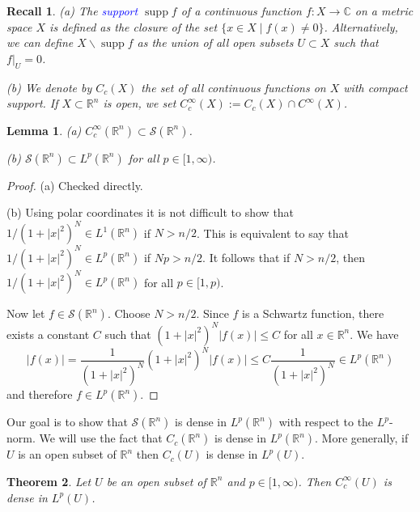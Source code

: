 \documentclass[12pt, oneside, a4paper]{article}
\newtheorem{thm}{Theorem}[section]
\newtheorem{lem}[thm]{Lemma}
\def\supp{\operatorname{supp}}
\theoremstyle{dfn}
\newtheorem{recall}{Recall}
\def \S {\ensuremath{\mathcal{S}}}
\def \S {\ensuremath{\mathcal{S}}}
\def\Rbb{\ensuremath{\mathbb{R}}}
\newcommand{\Com}{\mathbb{C}}
\providecommand{\abs}[1]{\lvert#1\rvert}
\begin{document}
\begin{recall}
(a) The \textcolor{blue}{support} $\supp f$ of a continuous function $f \colon X \to \Com$ on a metric space $X$ is defined as the closure of the set $\{ x \in X \mid f(x) \neq 0 \}$. Alternatively, we can define $X \smallsetminus \supp f$ as the union of all open subsets $U \subset X$ such that $f|_U = 0$.

(b) We denote by $C_c(X)$ the set of all continuous functions on $X$ with compact support. If $X \subset \Rbb^n$ is open, we set $C_c^\infty(X) := C_c(X) \cap C^\infty(X)$.
\end{recall}

\begin{lem}\label{SchSubsetLP}
(a) $C_c^\infty(\Rbb^n) \subset \S(\Rbb^n)$.

(b) $\S(\Rbb^n) \subset L^p(\Rbb^n)$ for all $p \in [1,\infty)$.
\end{lem}

\begin{proof}
(a) Checked directly.

(b) Using polar coordinates it is not difficult to show that $1/(1 + \abs{x}^2)^N \in L^1(\Rbb^n)$ if $N > n/2$. This is equivalent to say that $1/(1 + \abs{x}^2)^N \in L^p(\Rbb^n)$ if $Np > n/2$. It follows that if $N > n/2$, then $1/(1 + \abs{x}^2)^N \in L^p(\Rbb^n)$ for all $p \in [1,p)$.

Now let $f \in \S(\Rbb^n)$. Choose $N > n/2$. Since $f$ is a Schwartz function, there exists a constant $C$ such that $(1 + \abs{x}^2)^N \abs{f(x)} \leqslant C$ for all $x \in \Rbb^n$. We have
\[
\abs{f(x)} = \frac{1}{(1 + \abs{x}^2)^N} (1 + \abs{x}^2)^N \abs{f(x)} \leqslant C \frac{1}{(1 + \abs{x}^2)^N} \in L^p(\Rbb^n)
\]
and therefore $f \in L^p(\Rbb^n)$.
\end{proof}

Our goal is to show that $\S(\Rbb^n)$ is dense in $L^p(\Rbb^n)$ with respect to the $L^p$-norm. We will use the fact that $C_c(\Rbb^n)$ is dense in $L^p(\Rbb^n)$. More generally, if $U$ is an open subset of $\Rbb^n$ then $C_c(U)$ is dense in $L^p(U)$.

\begin{thm}\label{SCSdenseLP} %
Let $U$ be an open subset of $\Rbb^n$ and $p \in [1,\infty)$.
Then $C_c^\infty(U)$ is dense in $L^p(U)$.
\end{thm}
\end{document}
